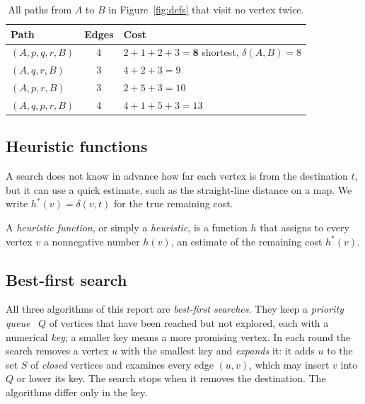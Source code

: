 \begin{table}[htbp]
  \centering
  \caption{All paths from $A$ to $B$ in Figure~\ref{fig:defs} that visit no
    vertex twice.}\label{tab:defs-paths}
  \begin{tabular}{@{}lcl@{}}
    \toprule
    Path & Edges & Cost\\
    \midrule
    $(A, p, q, r, B)$ & 4 & $2 + 1 + 2 + 3 = \mathbf{8}$ \quad shortest, $\delta(A,B) = 8$\\
    $(A, q, r, B)$    & 3 & $4 + 2 + 3 = 9$\\
    $(A, p, r, B)$    & 3 & $2 + 5 + 3 = 10$\\
    $(A, q, p, r, B)$ & 4 & $4 + 1 + 5 + 3 = 13$\\
    \bottomrule
  \end{tabular}
\end{table}

\subsection{Heuristic functions}\label{sec:def-heuristic}

A search does not know in advance how far each vertex is from the destination
$t$, but it can use a quick estimate, such as the straight-line distance on a
map. We write $h^{*}(v) = \delta(v,t)$ for the true remaining cost.

\begin{definition}\label{def:heuristic}
A \emph{heuristic function}, or simply a \emph{heuristic}, is a function $h$
that assigns to every vertex $v$ a nonnegative number $h(v)$, an estimate of
the remaining cost $h^{*}(v)$.
\end{definition}

\subsection{Best-first search}\label{sec:bestfirst}

All three algorithms of this report are \emph{best-first searches}. They keep a
\emph{priority queue}~\cite{baeldungpq} $Q$ of vertices that have been reached but not explored,
each with a numerical \emph{key}; a smaller key means a more promising vertex.
In each round the search removes a vertex $u$ with the smallest key and
\emph{expands} it: it adds $u$ to the set $S$ of \emph{closed} vertices and
examines every edge $(u,v)$, which may insert $v$ into $Q$ or lower its key.
The search stops when it removes the destination. The algorithms differ only in
the key.

